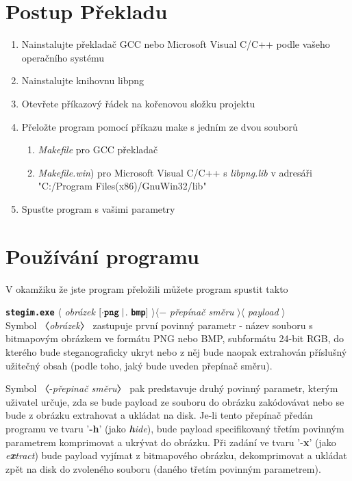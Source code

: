 \documentclass[12pt]{report}
\begin{document}
    \section{Postup Překladu}
    \begin{enumerate}
        \item Nainstalujte překladač GCC nebo Microsoft Visual C/C++ podle vašeho operačního systému
        \item Nainstalujte knihovnu libpng
        \item  Otevřete příkazový řádek na kořenovou složku projektu
        \item  Přeložte program pomocí příkazu make s jedním ze dvou souborů
        \begin{enumerate}
            \item \textit{ Makefile} pro GCC překladač
            \item \textit{  Makefile.win}) pro Microsoft Visual C/C++ s \textit{libpng.lib} v adresáři "C:/Program Files(x86)/GnuWin32/lib"
        \end{enumerate}
        \item  Spusťte program s vašimi parametry
    \end{enumerate}

    \section{Používání programu}
    V okamžiku že jste program přeložili můžete program spustit takto

    \texttt{\textbf{stegim.exe}} $\langle$ \textit{obrázek} $[\cdot \mathrm{\texttt{\textbf{png}}} \mid$. \texttt{\textbf{bmp}}] $\rangle\langle-$ \textit{přepínač směru} $\rangle\langle$ \textit{payload} $\rangle$\\

    Symbol 〈\textit{obrázek}〉 zastupuje první povinný parametr - název souboru s bitmapovým obrázkem ve formátu PNG nebo BMP, subformátu 24-bit RGB, do kterého bude steganograficky ukryt nebo
    z něj bude naopak extrahován příslušný užitečný obsah (podle toho, jaký bude uveden přepínač směru).

    Symbol 〈-\textit{přepinač směru}〉 pak predstavuje druhý povinný parametr, kterým uživatel určuje, zda se bude payload ze souboru do obrázku zakódovávat nebo se bude z obrázku extrahovat a ukládat na disk. Je-li tento přepínač předán programu ve tvaru '\textbf{-h}' (jako\textit{ \textbf{h}ide}), bude payload specifikovaný třetím povinným parametrem komprimovat a ukrývat do obrázku. Při zadání ve tvaru '-\textbf{x}' (jako \textit{e\textbf{x}tract}) bude payload vyjímat z bitmapového obrázku, dekomprimovat a ukládat zpět na disk do zvoleného souboru (daného třetím povinným parametrem).
\end{document}
